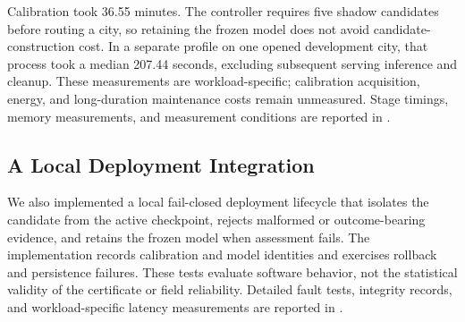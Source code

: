 Calibration took 36.55 minutes. The controller requires five shadow candidates before routing
a city, so retaining the frozen model does not avoid candidate-construction cost. In a separate
profile on one opened development city, that process took a median 207.44 seconds, excluding
subsequent serving inference and cleanup. These measurements are workload-specific; calibration
acquisition, energy, and long-duration maintenance costs remain unmeasured. Stage timings,
memory measurements, and measurement conditions are reported in
.

\subsection{A Local Deployment Integration}
\label{sec:nextphase-deployment}

We also implemented a local fail-closed deployment lifecycle that isolates the candidate from the active checkpoint, rejects malformed or outcome-bearing evidence, and retains the frozen model when assessment fails. The implementation records calibration and model identities and exercises rollback and persistence failures. These tests evaluate software behavior, not the statistical validity of the certificate or field reliability. Detailed fault tests, integrity records, and workload-specific latency measurements are reported in .
